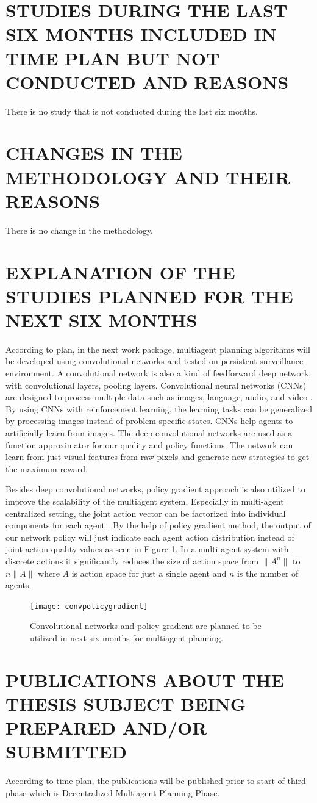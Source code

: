 \documentclass{ituphdreport}
\begin{document}
\section{STUDIES DURING THE LAST SIX MONTHS INCLUDED IN TIME PLAN BUT NOT CONDUCTED AND REASONS}
There is no study that is not conducted during the last six months. 

\section{CHANGES IN THE METHODOLOGY AND THEIR REASONS}
There is no change in the methodology.

\section{EXPLANATION OF THE STUDIES PLANNED FOR THE NEXT SIX MONTHS}
According to plan, in the next work package, multiagent planning algorithms will be developed using convolutional networks and tested on persistent surveillance environment. A convolutional network is also a kind of feedforward deep network, with convolutional layers, pooling layers. Convolutional neural networks (CNNs) are designed to process multiple data such as images, language, audio, and video \cite{li2017deep}. By using CNNs with reinforcement learning, the learning tasks can be generalized by processing images instead of problem-specific states. CNNs help agents to artificially learn from images. The deep convolutional networks are used as a function approximator for our quality and policy functions. The network can learn from just visual features from raw pixels and generate new strategies to get the maximum reward.

Besides deep convolutional networks, policy gradient approach is also utilized to improve the scalability of the multiagent system. Especially in multi-agent centralized setting, the joint action vector can be factorized into individual components for each agent \cite{gupta2017cooperative}. By the help of policy gradient method, the output of our network policy will just indicate each agent action distribution instead of joint action quality values as seen in Figure \ref{fig:convpolicygradient}. In a multi-agent system with discrete actions it significantly reduces the size of action space from $\| A^n \| $ to $n\|A\|$ where $A$ is action space for just a single agent and $n$ is the number of agents.

\begin{figure}[h]
	\begin{center}
		\texttt{[image: convpolicygradient]}
	\end{center}
	\caption{Convolutional networks and policy gradient are planned to be utilized in next six months for multiagent planning.
		\label{fig:convpolicygradient}}
\end{figure}

\section{PUBLICATIONS ABOUT THE THESIS SUBJECT BEING PREPARED AND/OR SUBMITTED}
According to time plan, the publications will be published prior to start of third phase which is Decentralized Multiagent Planning Phase.

\newpage


\end{document}
